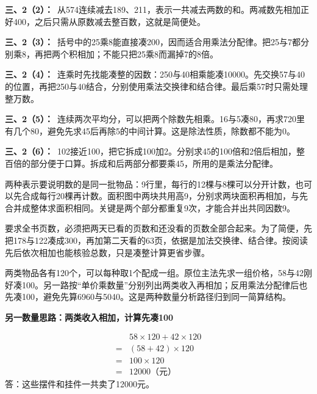 \documentclass[multi=snippet,border=0pt]{standalone}
\newenvironment{snippet}[3]{\begin{minipage}{#1bp}\color{answerred}\fontsize{#2}{#3}\selectfont\raggedright}{\end{minipage}}
\begin{document}
\begin{snippet}{505}{11.5}{14}\textbf{三、2（2）：}\ 从574连续减去189、211，表示一共减去两数的和。两减数先相加正好400，之后只需从原数减去整百数，这就是简便处。\end{snippet}
\begin{snippet}{505}{11.5}{14}\textbf{三、2（3）：}\ 括号中的25乘8能直接凑200，因而适合用乘法分配律。把25与7都分别乘8，再把两个积相加；不能只把25乘8而漏掉7的8倍。\end{snippet}
\begin{snippet}{505}{11.5}{14}\textbf{三、2（4）：}\ 连乘时先找能凑整的因数：250与40相乘能凑10000。先交换57与40的位置，再把250与40结合，分别使用乘法交换律和结合律。最后乘57时只需处理整万数。\end{snippet}
\begin{snippet}{505}{11.5}{14}\textbf{三、2（5）：}\ 连续两次平均分，可以把两个除数先相乘。16与5凑80，再求720里有几个80，避免先求45后再除5的中间计算。这是除法性质，除数都不能为0。\end{snippet}
\begin{snippet}{505}{11.5}{14}\textbf{三、2（6）：}\ 102接近100，把它拆成100加2。分别求45的100倍和2倍后相加，整百倍的部分便于口算。拆成和后两部分都要乘45，所用的是乘法分配律。\end{snippet}
\begin{snippet}{505}{11.5}{14}两种表示要说明数的是同一批物品：9行里，每行的12棵与8棵可以分开计数，也可以先合成每行20棵再计数。面积图中两块共用高9，分别求两块面积再相加，与先合并成整体求面积相同。关键是两个部分都重复9次，才能合并出共同因数9。\end{snippet}
\begin{snippet}{505}{11.5}{14}要求全书页数，必须把两天已看的页数和还没看的页数全部合起来。为了简便，先把178与122凑成300，再加第二天看的63页，依据是加法交换律、结合律。按阅读先后依次相加也能核验总数，只是凑整计算更省步骤。\end{snippet}
\begin{snippet}{505}{11.5}{14}两类物品各有120个，可以每种取1个配成一组。原位主法先求一组价格，58与42刚好凑100。另一路按“单价乘数量”分别列出两类收入再相加；反用乘法分配律后也先凑100，避免先算6960与5040。这是两种数量分析路径归到同一简算结构。\par \textbf{另一数量思路：两类收入相加，计算先凑100}\par \[\begin{aligned}&58\times120+42\times120\\={}&(58+42)\times120\\={}&100\times120\\={}&12000\text{（元）}\end{aligned}\]答：这些摆件和挂件一共卖了12000元。\end{snippet}
\end{document}
